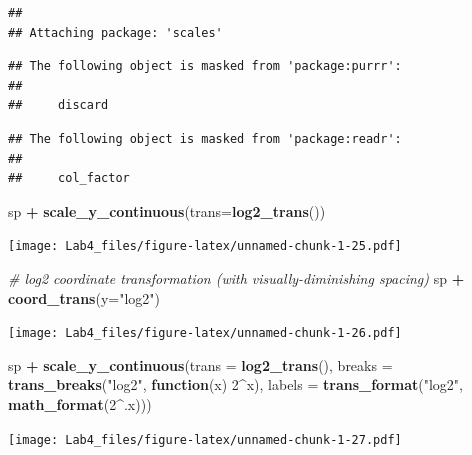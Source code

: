 \documentclass[]{article}
\newenvironment{Shaded}{\begin{snugshade}}{\end{snugshade}}
\newcommand{\KeywordTok}[1]{\textcolor[rgb]{0.13,0.29,0.53}{\textbf{#1}}}
\newcommand{\DataTypeTok}[1]{\textcolor[rgb]{0.13,0.29,0.53}{#1}}
\newcommand{\DecValTok}[1]{\textcolor[rgb]{0.00,0.00,0.81}{#1}}
\newcommand{\StringTok}[1]{\textcolor[rgb]{0.31,0.60,0.02}{#1}}
\newcommand{\CommentTok}[1]{\textcolor[rgb]{0.56,0.35,0.01}{\textit{#1}}}
\newcommand{\ControlFlowTok}[1]{\textcolor[rgb]{0.13,0.29,0.53}{\textbf{#1}}}
\newcommand{\OperatorTok}[1]{\textcolor[rgb]{0.81,0.36,0.00}{\textbf{#1}}}
\newcommand{\NormalTok}[1]{#1}
\begin{document}
\begin{verbatim}
## 
## Attaching package: 'scales'
\end{verbatim}

\begin{verbatim}
## The following object is masked from 'package:purrr':
## 
##     discard
\end{verbatim}

\begin{verbatim}
## The following object is masked from 'package:readr':
## 
##     col_factor
\end{verbatim}

\begin{Shaded}
\begin{Highlighting}[]
\NormalTok{sp }\OperatorTok{+}\StringTok{ }\KeywordTok{scale_y_continuous}\NormalTok{(}\DataTypeTok{trans=}\KeywordTok{log2_trans}\NormalTok{())}
\end{Highlighting}
\end{Shaded}

\texttt{[image: Lab4\_files/figure-latex/unnamed-chunk-1-25.pdf]}

\begin{Shaded}
\begin{Highlighting}[]
\CommentTok{# log2 coordinate transformation (with visually-diminishing spacing)}
\NormalTok{sp }\OperatorTok{+}\StringTok{ }\KeywordTok{coord_trans}\NormalTok{(}\DataTypeTok{y=}\StringTok{"log2"}\NormalTok{)}
\end{Highlighting}
\end{Shaded}

\texttt{[image: Lab4\_files/figure-latex/unnamed-chunk-1-26.pdf]}

\begin{Shaded}
\begin{Highlighting}[]
\NormalTok{sp }\OperatorTok{+}\StringTok{ }\KeywordTok{scale_y_continuous}\NormalTok{(}\DataTypeTok{trans =} \KeywordTok{log2_trans}\NormalTok{(),}
                        \DataTypeTok{breaks =} \KeywordTok{trans_breaks}\NormalTok{(}\StringTok{"log2"}\NormalTok{, }\ControlFlowTok{function}\NormalTok{(x) }\DecValTok{2}\OperatorTok{^}\NormalTok{x),}
                        \DataTypeTok{labels =} \KeywordTok{trans_format}\NormalTok{(}\StringTok{"log2"}\NormalTok{, }\KeywordTok{math_format}\NormalTok{(}\DecValTok{2}\OperatorTok{^}\NormalTok{.x)))}
\end{Highlighting}
\end{Shaded}

\texttt{[image: Lab4\_files/figure-latex/unnamed-chunk-1-27.pdf]}
\end{document}
